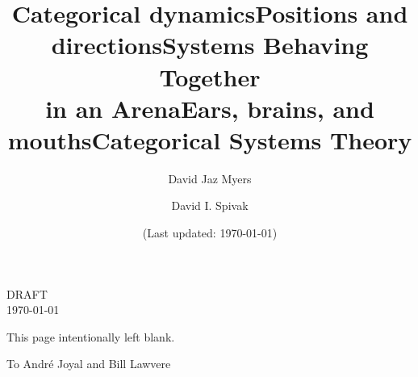\documentclass[11pt, book]{memoir}
\newcommand{\titlefont}{\normalfont\Huge\bfseries}
\theoremstyle{plain}
\theoremstyle{plain}
\theoremstyle{remark}
\newenvironment{dedication}
     {\hfill}
     {}
\newcommand{\0}{\textsf{0}}
\newcommand{\1}{\textsf{1}}
\newcommand{\2}{\textsf{2}}
\newcommand{\3}{\textsf{3}}
\newcommand{\4}{\textsf{4}}
\newcommand{\5}{\textsf{5}}
\newcommand{\6}{\textsf{6}}
\newcommand{\7}{\textsf{7}}
\newcommand{\8}{\textsf{8}}
\newcommand{\9}{\textsf{9}}
\begin{document}
\frontmatter

\title{\titlefont Categorical dynamics}
\title{\titlefont Positions and directions}
\title{\titlefont Systems Behaving Together\\in an Arena}
\title{\titlefont Ears, brains, and mouths}
\title{\titlefont Categorical Systems Theory}

\author{\LARGE David Jaz Myers\and \LARGE  David I. Spivak\normalsize}




\posttitle{
\vspace{.8in}
\normalsize
\[
\coverpic
\]
  \vspace{.5in}
  \endgroup
}
\begin{center}
\Huge DRAFT\\\normalsize
\today
\end{center}

\date{\vfill (Last updated: \today)}



\maketitle


\thispagestyle{empty}
\clearpage
This page intentionally left blank.
\clearpage

\begin{dedication}
To Andr\'e Joyal and Bill Lawvere
\end{dedication}

\clearpage



\clearpage
\tableofcontents*

\mainmatter
{}














\appendix
\begingroup
\footnotesize



\backmatter
%

\printbibliography
\printindex
\end{document}
